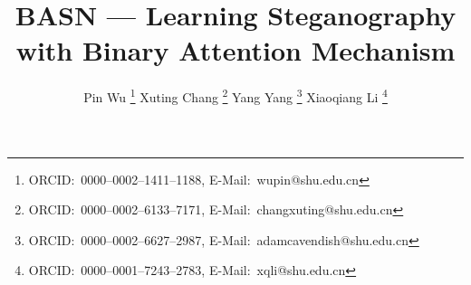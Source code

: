\author{%
  Pin Wu
  \thanks{ORCID:~0000--0002--1411--1188, E-Mail:~wupin@shu.edu.cn}
  Xuting Chang
  \thanks{ORCID:~0000--0002--6133--7171, E-Mail:~changxuting@shu.edu.cn}
  Yang Yang
  \thanks{ORCID:~0000--0002--6627--2987, E-Mail:~adamcavendish@shu.edu.cn}
  Xiaoqiang Li
  \thanks{ORCID:~0000--0001--7243--2783, E-Mail:~xqli@shu.edu.cn}
}

\title{BASN --- Learning Steganography with Binary Attention Mechanism}